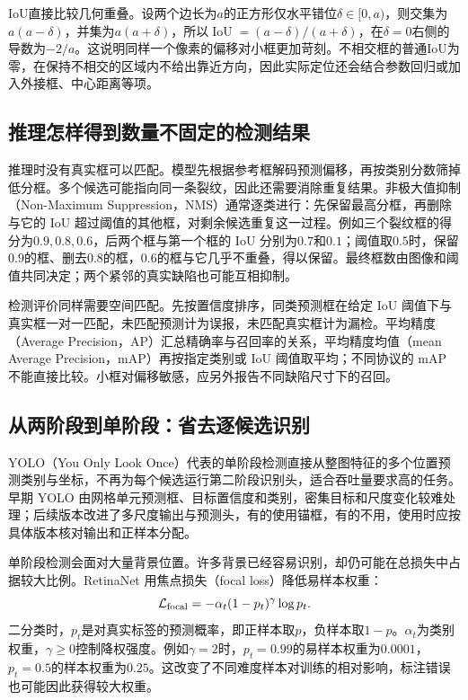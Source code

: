 IoU直接比较几何重叠。设两个边长为$a$的正方形仅水平错位$\delta\in[0,a)$，则交集为$a(a-\delta)$，并集为$a(a+\delta)$，所以$\operatorname{IoU}=(a-\delta)/(a+\delta)$，在$\delta=0$右侧的导数为$-2/a$。这说明同样一个像素的偏移对小框更加苛刻。不相交框的普通IoU为零，在保持不相交的区域内不给出靠近方向，因此实际定位还会结合参数回归或加入外接框、中心距离等项。

\subsection{推理怎样得到数量不固定的检测结果}
推理时没有真实框可以匹配。模型先根据参考框解码预测偏移，再按类别分数筛掉低分框。多个候选可能指向同一条裂纹，因此还需要消除重复结果。非极大值抑制（Non-Maximum Suppression，NMS）通常逐类进行：先保留最高分框，再删除与它的 IoU 超过阈值的其他框，对剩余候选重复这一过程。例如三个裂纹框的得分为$0.9,0.8,0.6$，后两个框与第一个框的 IoU 分别为$0.7$和$0.1$；阈值取$0.5$时，保留$0.9$的框、删去$0.8$的框，$0.6$的框与它几乎不重叠，得以保留。最终框数由图像和阈值共同决定；两个紧邻的真实缺陷也可能互相抑制。

检测评价同样需要空间匹配。先按置信度排序，同类预测框在给定 IoU 阈值下与真实框一对一匹配，未匹配预测计为误报，未匹配真实框计为漏检。平均精度（Average Precision，AP）汇总精确率与召回率的关系，平均精度均值（mean Average Precision，mAP）再按指定类别或 IoU 阈值取平均；不同协议的 mAP 不能直接比较。小框对偏移敏感，应另外报告不同缺陷尺寸下的召回。

\subsection{从两阶段到单阶段：省去逐候选识别}
YOLO（You Only Look Once）代表的单阶段检测直接从整图特征的多个位置预测类别与坐标，不再为每个候选运行第二阶段识别头，适合吞吐量要求高的任务。早期 YOLO 由网格单元预测框、目标置信度和类别，密集目标和尺度变化较难处理；后续版本改进了多尺度输出与预测头，有的使用锚框，有的不用，使用时应按具体版本核对输出和正样本分配。

单阶段检测会面对大量背景位置。许多背景已经容易识别，却仍可能在总损失中占据较大比例。RetinaNet 用焦点损失（focal loss）降低易样本权重：
\begin{equation}
 \mathcal L_{\rm focal}=-\alpha_t(1-p_t)^\gamma\log p_t.
\end{equation}
二分类时，$p_t$是对真实标签的预测概率，即正样本取$p$，负样本取$1-p$。$\alpha_t$为类别权重，$\gamma\geq0$控制降权强度。例如$\gamma=2$时，$p_t=0.99$的易样本权重为$0.0001$，$p_t=0.5$的样本权重为$0.25$。这改变了不同难度样本对训练的相对影响，标注错误也可能因此获得较大权重。

